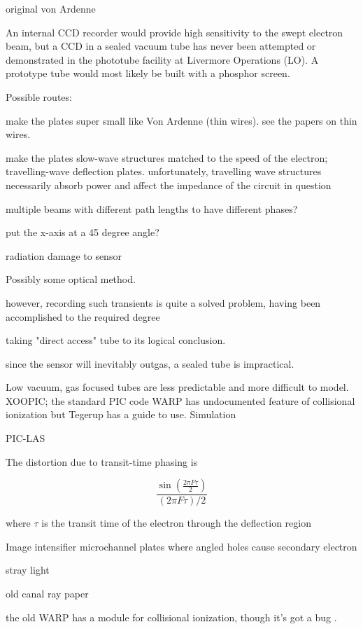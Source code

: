 \documentclass[paper.tex]{subfiles}
\begin{document}
original von Ardenne 


\begin{fquote}
An internal CCD recorder would provide high sensitivity to the swept electron beam, but a CCD in a sealed vacuum tube has never been attempted or demonstrated in the phototube facility at Livermore Operations (LO). A prototype tube would most likely be built with a phosphor screen.
\end{fquote}


Possible routes:

make the plates super small like Von Ardenne (thin wires). see the papers on thin wires.

make the plates slow-wave structures matched to the speed of the electron; travelling-wave deflection plates.
unfortunately, travelling wave structures necessarily absorb power and affect the impedance of the circuit in question


multiple beams with different path lengths to have different phases?

put the x-axis at a 45 degree angle?


radiation damage to sensor 

Possibly some optical method. 

however, recording such transients is quite a solved problem, having been accomplished to the required degree 

taking "direct access" tube to its logical conclusion.

since the sensor will inevitably outgas, a sealed tube is impractical.


Low vacuum, gas focused tubes are less predictable and more difficult to model. XOOPIC; the standard PIC code WARP has undocumented feature of collisional ionization but Tegerup has a guide to use. Simulation

PIC-LAS




The distortion due to transit-time phasing is

$$ \frac{\sin(\frac{2\pi F \tau}{2})}{(2\pi F \tau)/2} $$

where $\tau$ is the transit time of the electron through the deflection region 

Image intensifier microchannel plates where angled holes cause secondary electron 


stray light 

old canal ray paper


the old WARP has a module for collisional ionization, though it's got a bug \cite{Simulation}.
\end{document}
